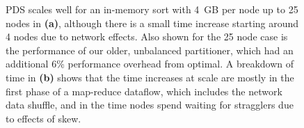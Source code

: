 {
\renewcommand{\baselinestretch}{1.0}
\begin{figure}[t]
\begin{center}
  {PDS scales well for an
  in-memory sort with 4~GB per node up to 25 nodes in {\bf (a)},
  although there is a small time increase starting around 4 nodes due
  to network effects.  Also shown for the 25 node case is the
  performance of our older, unbalanced partitioner, which had an
  additional 6\% performance overhead from optimal.  A breakdown of
  time in {\bf (b)} shows that the time increases at scale are mostly
  in the first phase of a map-reduce dataflow, which includes the
  network data shuffle, and in the time nodes spend waiting for
  stragglers due to effects of skew. }

\label{fig:pds:sort1}
\end{center}
\end{figure}
}

